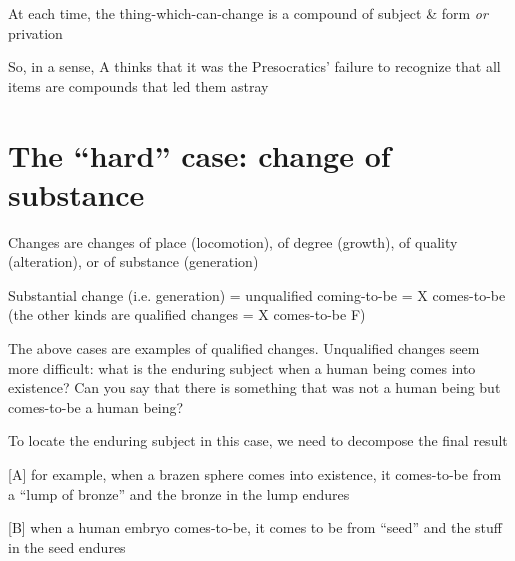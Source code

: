 \documentclass[11pt]{article}
\begin{document}
\noindent At each time, the thing-which-can-change is a compound of subject \& form \emph{or} privation
\vspace*{2mm}

\noindent So, in a sense, A thinks that it was the Presocratics' failure to recognize that all items are compounds that led them astray

\section*{The ``hard'' case: change of substance}

\noindent Changes are changes of place (locomotion), of degree (growth), of quality (alteration), or of substance (generation)
\vspace*{2mm}

\noindent Substantial change (i.e. generation) = unqualified coming-to-be = X comes-to-be (the other kinds are qualified changes = X comes-to-be F)
\vspace*{2mm}

\noindent The above cases are examples of qualified changes. Unqualified changes seem more difficult: what is the enduring subject when a human being comes into existence? Can you say that there is something that was not a human being but comes-to-be a human being?
\vspace*{2mm}

\noindent To locate the enduring subject in this case, we need to decompose the final result
\vspace*{1mm}

[A] for example, when a brazen sphere comes into existence, it comes-to-be from a ``lump of bronze'' and the bronze in the lump endures
\vspace*{1mm}

[B] when a human embryo comes-to-be, it comes to be from ``seed'' and the stuff in the seed endures
\end{document}
